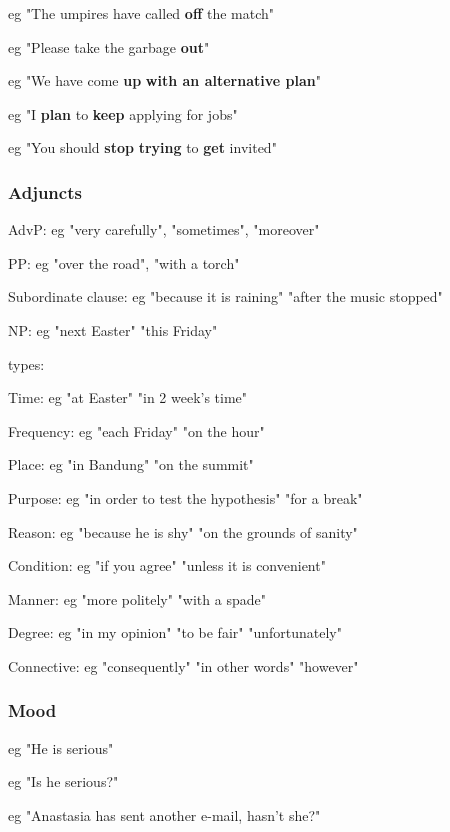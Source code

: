 eg "The umpires have called \textbf{off} the match"

eg "Please take the garbage \textbf{out}"

eg "We have come \textbf{up} \textbf{with an alternative plan}"


eg "I \textbf{plan} to \textbf{keep} applying for jobs"

eg "You should \textbf{stop} \textbf{trying} to \textbf{get} invited"

\subsubsection{Adjuncts}

AdvP: eg "very carefully", "sometimes", "moreover"

PP: eg "over the road", "with a torch"

Subordinate clause:  eg "because it is raining" "after the music stopped"

NP: eg "next Easter" "this Friday"

types:

Time:  eg "at Easter" "in 2 week's time"

Frequency:  eg "each Friday" "on the hour"

Place: eg "in Bandung" "on the summit"

Purpose: eg "in order to test the hypothesis" "for a break"

Reason: eg "because he is shy" "on the grounds of sanity"

Condition: eg "if you agree" "unless it is convenient"

Manner: eg "more politely" "with a spade"

Degree: eg "in my opinion" "to be fair" "unfortunately"

Connective: eg "consequently" "in other words" "however"

\subsubsection{Mood}


eg "He is serious"


eg "Is he serious?"

eg "Anastasia has sent another e-mail, hasn't she?"


